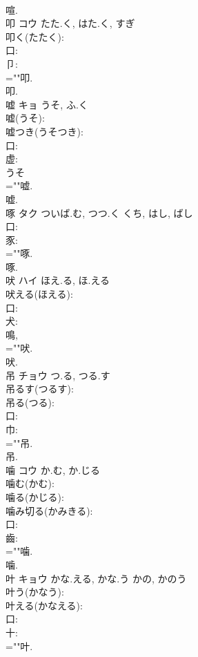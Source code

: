 \documentclass[8pt]{extreport}
\begin{document}
\begin{CJK}{UTF8}{min}
\\	喧.
\\	叩	コウ	たた.く, はた.く, すぎ		
\\	叩く(たたく): 
\\	口: 
\\	卩: 
\\	=""叩.
\\	叩.
\\	嘘	キョ	うそ, ふ.く		
\\	嘘(うそ): 
\\	嘘つき(うそつき): 
\\	口: 
\\	虚: 
\\	うそ 
\\	=""嘘.
\\	嘘.
\\	啄	タク	ついば.む, つつ.く	くち, はし, ばし	
\\	口: 
\\	豕: 
\\	=""啄.
\\	啄.
\\	吠	ハイ	ほえ.る, ほ.える		
\\	吠える(ほえる): 
\\	口: 
\\	犬: 
\\	鳴, 
\\	=""吠.
\\	吠.
\\	吊	チョウ	つ.る, つる.す		
\\	吊るす(つるす): 
\\	吊る(つる): 
\\	口: 
\\	巾: 
\\	=""吊.
\\	吊.
\\	噛	コウ	か.む, か.じる		
\\	噛む(かむ): 
\\	噛る(かじる): 
\\	噛み切る(かみきる): 
\\	口: 
\\	齒: 
\\	=""噛.
\\	噛.
\\	叶	キョウ	かな.える, かな.う	かの, かのう	
\\	叶う(かなう): 
\\	叶える(かなえる): 
\\	口: 
\\	十: 
\\	=""叶.

\end{CJK}
\end{document}
